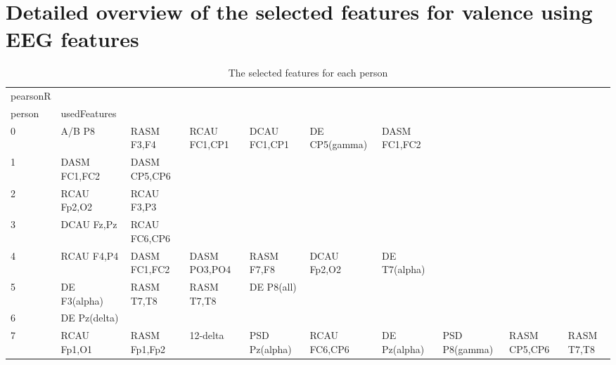 \chapter{Detailed overview of the selected features for valence using EEG features}

\begin{landscape}
\begin{table}[]
\centering
\caption{The selected features for each person}
\begin{tabular}{l|llllllll}
pearsonR &                &                &                &                &                &                &               &                &               &               \\
person   & usedFeatures   &                &                &                &                &                &               &                &               &               \\
0        & A/B P8         & RASM F3,F4     & RCAU FC1,CP1   & DCAU FC1,CP1   & DE CP5(gamma)  & DASM FC1,FC2   &               &                &               &               \\
1        & DASM FC1,FC2   & DASM CP5,CP6   &                &                &                &                &               &                &               &               \\
2        & RCAU Fp2,O2    & RCAU F3,P3     &                &                &                &                &               &                &               &               \\
3        & DCAU Fz,Pz     & RCAU FC6,CP6   &                &                &                &                &               &                &               &               \\
4        & RCAU F4,P4     & DASM FC1,FC2   & DASM PO3,PO4   & RASM F7,F8     & DCAU Fp2,O2    & DE T7(alpha)   &               &                &               &               \\
5        & DE F3(alpha)   & RASM T7,T8     & RASM T7,T8     & DE P8(all)     &                &                &               &                &               &               \\
6        & DE Pz(delta)   &                &                &                &                &                &               &                &               &               \\
7        & RCAU Fp1,O1    & RASM Fp1,Fp2   & 12-delta       & PSD Pz(alpha)  & RCAU FC6,CP6   & DE Pz(alpha)   & PSD P8(gamma) & RASM CP5,CP6   & RASM T7,T8    &               \\

\end{tabular}
\end{table}
\end{landscape}
